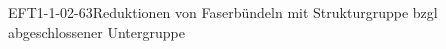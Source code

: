 
\begin{DEF}{EFT1-1-02-63}{Reduktionen von Faserbündeln mit Strukturgruppe bzgl abgeschlossener Untergruppe}
\end{DEF}
